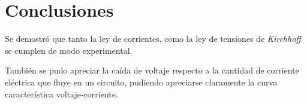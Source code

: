\documentclass[letter,11pt]{article}
\begin{document}
\section{Conclusiones}
Se demostró que tanto la ley de corrientes, como la ley de tensiones de
\emph{Kirchhoff} se cumplen de modo experimental.

También se pudo apreciar la caída de voltaje respecto a la cantidad de corriente
eléctrica que fluye en un circuito, pudiendo apreciarse claramente la curva
característica voltaje-corriente.
\end{document}
